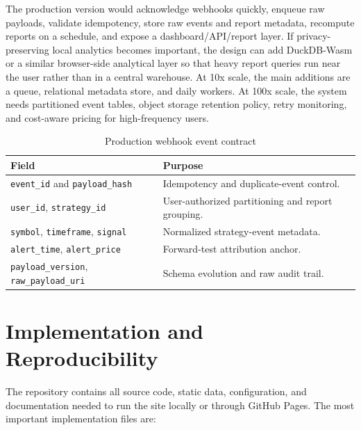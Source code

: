 \documentclass[11pt,a4paper]{article}
\begin{document}
The production version would acknowledge webhooks quickly, enqueue raw payloads, validate idempotency, store raw events and report metadata, recompute reports on a schedule, and expose a dashboard/API/report layer. If privacy-preserving local analytics becomes important, the design can add DuckDB-Wasm or a similar browser-side analytical layer so that heavy report queries run near the user rather than in a central warehouse. At 10x scale, the main additions are a queue, relational metadata store, and daily workers. At 100x scale, the system needs partitioned event tables, object storage retention policy, retry monitoring, and cost-aware pricing for high-frequency users.

\begin{table}[H]
\centering
\caption{Production webhook event contract}
\small
\begin{tabularx}{\textwidth}{>{\raggedright\arraybackslash}p{3.0cm}X}
\toprule
\textbf{Field} & \textbf{Purpose} \\
\midrule
\texttt{event\_id} and \texttt{payload\_hash} & Idempotency and duplicate-event control. \\
\texttt{user\_id}, \texttt{strategy\_id} & User-authorized partitioning and report grouping. \\
\texttt{symbol}, \texttt{timeframe}, \texttt{signal} & Normalized strategy-event metadata. \\
\texttt{alert\_time}, \texttt{alert\_price} & Forward-test attribution anchor. \\
\texttt{payload\_version}, \texttt{raw\_payload\_uri} & Schema evolution and raw audit trail. \\
\bottomrule
\end{tabularx}
\end{table}

\section{Implementation and Reproducibility}

The repository contains all source code, static data, configuration, and documentation needed to run the site locally or through GitHub Pages. The most important implementation files are:
\end{document}
